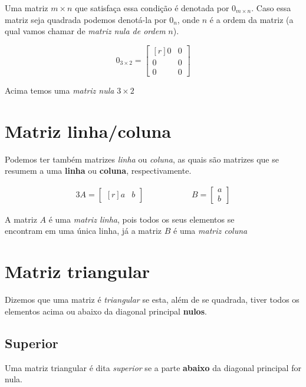 Uma matriz $m\times n$ que satisfaça essa condição é denotada por $0_{m \times n}$.
Caso essa matriz seja quadrada podemos denotá-la por $0_n$, onde $n$ é a ordem da matriz (a qual vamos chamar de \textit{matriz nula de ordem} $n$).

$$
0_{3 \times 2}=
\begin{bmatrix*}[r]
0 & 0 \\
0 & 0 \\
0 & 0
\end{bmatrix*}
$$
\centerline{\footnotesize{Acima temos uma \textit{matriz nula} $3 \times 2$}}

\section{Matriz linha/coluna}

Podemos ter também matrizes \textit{linha} ou \textit{coluna}, as quais são matrizes que se resumem a uma \textbf{linha} ou \textbf{coluna}, respectivamente.

\begin{alignat*}{3}
    A=\begin{bmatrix*}[r] a & b \end{bmatrix*} & \hspace{50pt} & B=\begin{bmatrix}a \\ b\end{bmatrix}
\end{alignat*}

\begin{center}
    \footnotesize{A matriz $A$ é uma \textit{matriz linha}, pois todos os seus elementos se\\ encontram em uma única linha, já a matriz $B$ é uma \textit{matriz coluna}}
\end{center}

\section{Matriz triangular}

Dizemos que uma matriz é \textit{triangular} se esta, além de se quadrada, tiver todos os elementos acima ou abaixo da diagonal principal \textbf{nulos}.

\subsection{Superior}
Uma matriz triangular é dita \textit{superior} se a parte \textbf{abaixo} da diagonal principal for nula.

